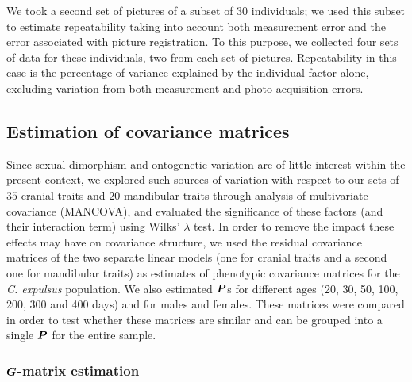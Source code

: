 \documentclass [twocolumn, natbib, nospthms, 10pt] {svjour3}
\begin{document}
We took a second set of pictures of a subset of $30$ individuals; we
used this subset to estimate repeatability taking into account both
measurement error and the error associated with picture
registration. To this purpose, we collected four sets of data for these
individuals, two from each set of pictures. Repeatability in this case
is the percentage of variance explained by the individual factor
alone, excluding variation from both measurement and photo acquisition
errors.

\subsection {Estimation of covariance matrices}
\label {mms:cov}

Since sexual dimorphism and ontogenetic variation are of little
interest within the present context, we explored such sources of
variation with respect to our sets of $35$ cranial traits and $20$
mandibular traits through analysis of multivariate covariance
(MANCOVA), and evaluated the significance of these factors (and their
interaction term) using Wilks' $\lambda$ test. In order to remove the
impact these effects may have on covariance structure, we used the
residual covariance matrices of the two separate linear models (one
for cranial traits and a second one for mandibular traits) as
estimates of phenotypic covariance matrices for the \emph{C. expulsus}
population. We also estimated $\boldsymbol{P}$s for different ages (20, 30,
50, 100, 200, 300 and 400 days) and for males and females. These
matrices were compared in order to test whether these matrices are
similar and can be grouped into a single $\boldsymbol{P}$ for the entire
sample.

\subsubsection{$\boldsymbol{G}$-matrix estimation}
\end{document}
